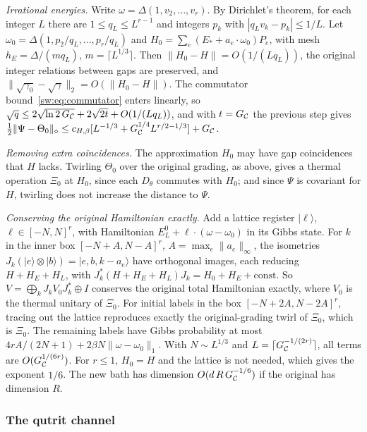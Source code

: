 \emph{Irrational energies.} Write $\omega=\Delta(1,v_2,\dots,v_r)$. By Dirichlet's theorem, for each integer $L$ there are $1\le q_L\le L^{r-1}$ and integers $p_k$ with $|q_Lv_k-p_k|\le1/L$. Let $\omega_0=\Delta(1,p_2/q_L,\dots,p_r/q_L)$ and $H_0=\sum_e(E_*+a_e\cdot\omega_0)P_e$, with mesh $h_E=\Delta/(mq_L)$, $m=\lceil L^{1/3}\rceil$. Then $\|H_0-H\|=O(1/(Lq_L))$, the original integer relations between gaps are preserved, and $\|\sqrt{\gamma_0}-\sqrt\gamma\|_2=O(\|H_0-H\|)$. The commutator bound~\eqref{sw:eq:commutator} enters linearly, so $\sqrt q\le2\sqrt{\ln2\,G_{\mathcal C}}+2\sqrt{2t}+O(1/(Lq_L))$, and with $t=G_{\mathcal C}$ the previous step gives $\tfrac12\|\Psi-\Theta_0\|_\diamond\le c_{H,\beta}[L^{-1/3}+G_{\mathcal C}^{1/4}L^{r/2-1/3}]+G_{\mathcal C}$.

\emph{Removing extra coincidences.} The approximation $H_0$ may have gap coincidences that $H$ lacks. Twirling $\Theta_0$ over the original grading, as above, gives a thermal operation $\Xi_0$ at $H_0$, since each $D_\theta$ commutes with $H_0$; and since $\Psi$ is covariant for $H$, twirling does not increase the distance to $\Psi$.

\emph{Conserving the original Hamiltonian exactly.} Add a lattice register $|\ell\rangle$, $\ell\in[-N,N]^r$, with Hamiltonian $E_L^0+\ell\cdot(\omega-\omega_0)$ in its Gibbs state. For $k$ in the inner box $[-N+A,N-A]^r$, $A=\max_e\|a_e\|_\infty$, the isometries $J_k(|e\rangle\otimes|b\rangle)=|e,b,k-a_e\rangle$ have orthogonal images, each reducing $H+H_E+H_L$, with $J_k^*(H+H_E+H_L)J_k=H_0+H_E+\text{const}$. So $V=\bigoplus_kJ_kV_0J_k^*\oplus I$ conserves the original total Hamiltonian exactly, where $V_0$ is the thermal unitary of $\Xi_0$. For initial labels in the box $[-N+2A,N-2A]^r$, tracing out the lattice reproduces exactly the original-grading twirl of $\Xi_0$, which is $\Xi_0$. The remaining labels have Gibbs probability at most $4rA/(2N+1)+2\beta N\|\omega-\omega_0\|_1$. With $N\sim L^{1/3}$ and $L=\lceil G_{\mathcal C}^{-1/(2r)}\rceil$, all terms are $O(G_{\mathcal C}^{1/(6r)})$. For $r\le1$, $H_0=H$ and the lattice is not needed, which gives the exponent $1/6$. The new bath has dimension $O(d\,R\,G_{\mathcal C}^{-1/6})$ if the original has dimension $R$.

\subsubsection{The qutrit channel}

